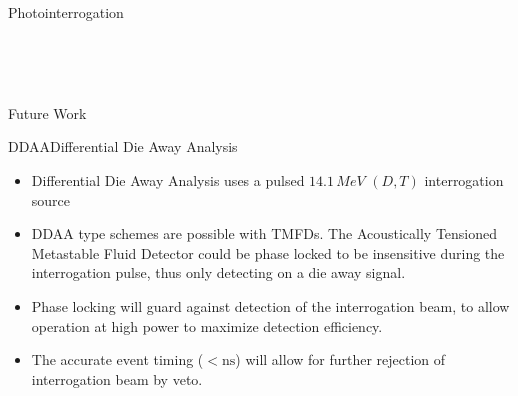 \documentclass{puposter}
\begin{document}
\begin{pucol}{5}{12}
\begin{pucell}{5}{8}{Photointerrogation}{}
\begin{pucol}{3}{8}
\begin{pucell}{3}{3}{}{}
      \end{pucell} \\
      \vspace*{\fill}
      \begin{pucell}{3}{5}{}{}
      \end{pucell}
    \end{pucol}%
  \end{pucell}
  \vspace*{\fill} \\
  \begin{pucell}{5}{4}{Future Work}{}
    \begin{pucell}{2}{4}{DDAA}{Differential Die Away Analysis}
      \vspace*{\fill}
      \begin{itemize}
        \item Differential Die Away Analysis uses a pulsed $14.1\,MeV$ $\left(D,T\right)$ interrogation source
        \item DDAA type schemes are possible with TMFDs. The Acoustically Tensioned Metastable Fluid Detector could be phase locked to be insensitive during the interrogation pulse, thus only detecting on a die away signal.
        \item Phase locking will guard against detection of the interrogation beam, to allow operation at high power to maximize detection efficiency.
        \item The accurate event timing ($<\mathrm{ns}$) will allow for further rejection of interrogation beam by veto.
      \end{itemize}
      \vspace*{\fill}
    \end{pucell}%
    \hspace*{\fill}
    \begin{pucell}{3}{4}{}{}
    \end{pucell}
  \end{pucell}%
\end{pucol}
\end{document}
